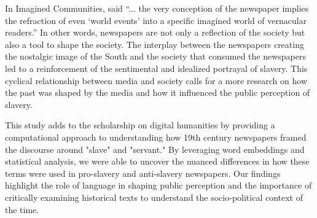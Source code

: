 \documentclass[11pt]{article}
\begin{document}
In Imagined Communities, \citet{anderson2006imagined} said ``... the very conception of the newspaper implies the refraction of even `world events' into a specific imagined world of vernacular readers.'' In other words, newspapers are not only a reflection of the society but also a tool to shape the society. The interplay between the newspapers creating the nostalgic image of the South and the society that consumed the newspapers led to a reinforcement of the sentimental and idealized portrayal of slavery. This cyclical relationship between media and society calls for a more research on how the past was 
shaped by the media and how it influenced the public perception of slavery.

This study adds to the scholarship on digital humanities by providing a computational approach to understanding how 19th century newspapers framed the discourse around "slave" and "servant." By leveraging word embeddings and statistical analysis, we were able to uncover the nuanced differences in how these terms were used in pro-slavery and anti-slavery newspapers. Our findings highlight the role of language in shaping public perception and the importance of critically examining historical texts to understand the socio-political context of the time.


\end{document}
